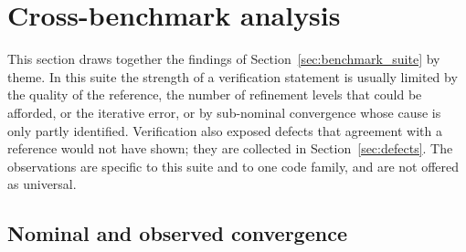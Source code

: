 \section{Cross-benchmark analysis}\label{sec:cross_benchmark}


This section draws together the findings of Section~\ref{sec:benchmark_suite} by theme.
In this suite the strength of a verification statement is usually limited by the quality of the reference, the number of refinement levels that could be afforded, or the iterative error, or by sub-nominal convergence whose cause is only partly identified.
Verification also exposed defects that agreement with a reference would not have shown; they are collected in Section~\ref{sec:defects}.
The observations are specific to this suite and to one code family, and are not offered as universal.

\subsection{Nominal and observed convergence}\label{sec:cross_convergence}

